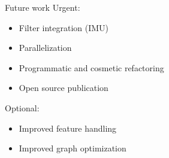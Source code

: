 \documentclass[11pt]{beamer}
\begin{document}
\begin{frame}{Future work}
Urgent:
\begin{itemize}
\item Filter integration (IMU)
\item Parallelization
\item Programmatic and cosmetic refactoring
\item Open source publication
\end{itemize}
\vspace{20pt}
Optional:
\begin{itemize}
\item Improved feature handling
\item Improved graph optimization
\end{itemize}
\end{frame}
\end{document}
